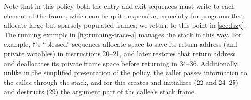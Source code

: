 \documentclass[acmsmall,review,anonymous]{acmart}\settopmatter{printfolios=true,printccs=false,printacmref=false}
\begin{document}



Note that in this policy both the entry and exit sequences
must write to each element of
the frame, which can be quite expensive, especially for programs that
allocate large but sparsely populated frames; we return to this point
in \cref{sec:lazy}.
%
The running example in \cref{fig:running-trace-a} manages the stack in this way.
For example, {\tt f}'s ``blessed'' sequences allocate space to save its return
address (and private variables) in instructions 20--21, and later restores that
return address and deallocates its private frame space before returning in
34--36. Additionally, unlike in the simplified presentation of the policy, the
caller passes information to the callee through the stack, and for this creates
and initializes (22 and 24--25) and destructs (29) the argument part of the
callee's stack frame.
%

\end{document}
